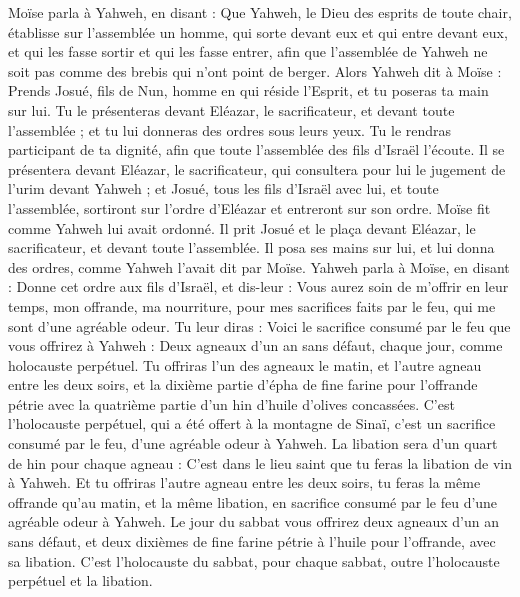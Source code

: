 \begin{multicols}{2}
Moïse parla à Yahweh, en disant :
Que Yahweh, le Dieu des esprits de toute chair, établisse sur l'assemblée un homme,
qui sorte devant eux et qui entre devant eux, et qui les fasse sortir et qui les fasse entrer, afin que l'assemblée de Yahweh ne soit pas comme des brebis qui n'ont point de berger.
Alors Yahweh dit à Moïse : Prends Josué, fils de Nun, homme en qui réside l'Esprit, et tu poseras ta main sur lui.
Tu le présenteras devant Eléazar, le sacrificateur, et devant toute l'assemblée ; et tu lui donneras des ordres sous leurs yeux.
Tu le rendras participant de ta dignité, afin que toute l'assemblée des fils d'Israël l'écoute.
Il se présentera devant Eléazar, le sacrificateur, qui consultera pour lui le jugement de l'urim devant Yahweh ; et Josué, tous les fils d’Israël avec lui, et toute l’assemblée, sortiront sur l’ordre d’Eléazar et entreront sur son ordre.
Moïse fit comme Yahweh lui avait ordonné. Il prit Josué et le plaça devant Eléazar, le sacrificateur, et devant toute l'assemblée.
Il posa ses mains sur lui, et lui donna des ordres, comme Yahweh l'avait dit par Moïse.
\VerseOne{}Yahweh parla à Moïse, en disant :
Donne cet ordre aux fils d'Israël, et dis-leur : Vous aurez soin de m'offrir en leur temps, mon offrande, ma nourriture, pour mes sacrifices faits par le feu, qui me sont d'une agréable odeur.
Tu leur diras : Voici le sacrifice consumé par le feu que vous offrirez à Yahweh : Deux agneaux d'un an sans défaut, chaque jour, comme holocauste perpétuel.
Tu offriras l'un des agneaux le matin, et l'autre agneau entre les deux soirs,
et la dixième partie d'épha de fine farine pour l’offrande pétrie avec la quatrième partie d'un hin d'huile d’olives concassées.
C'est l'holocauste perpétuel, qui a été offert à la montagne de Sinaï, c’est un sacrifice consumé par le feu, d’une agréable odeur à Yahweh.
La libation sera d'un quart de hin pour chaque agneau : C'est dans le lieu saint que tu feras la libation de vin à Yahweh.
Et tu offriras l'autre agneau entre les deux soirs, tu feras la même offrande qu'au matin, et la même libation, en sacrifice consumé par le feu d’une agréable odeur à Yahweh.
Le jour du sabbat vous offrirez deux agneaux d'un an sans défaut, et deux dixièmes de fine farine pétrie à l'huile pour l’offrande, avec sa libation.
C'est l'holocauste du sabbat, pour chaque sabbat, outre l'holocauste perpétuel et la libation.

\end{multicols}

